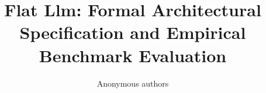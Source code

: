 \title{\textbf{Flat Llm: Formal Architectural Specification and Empirical Benchmark Evaluation}}

\author{Anonymous authors}
